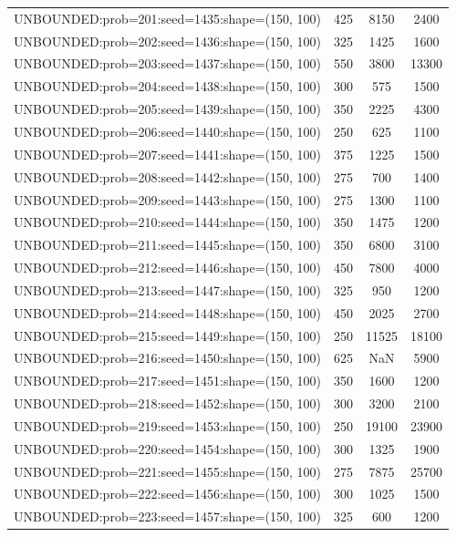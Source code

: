 \begin{longtable}{lccc}
UNBOUNDED:prob=201:seed=1435:shape=(150, 100) &      425 &  8150 &   2400 \\
UNBOUNDED:prob=202:seed=1436:shape=(150, 100) &      325 &  1425 &   1600 \\
UNBOUNDED:prob=203:seed=1437:shape=(150, 100) &      550 &  3800 &  13300 \\
UNBOUNDED:prob=204:seed=1438:shape=(150, 100) &      300 &   575 &   1500 \\
UNBOUNDED:prob=205:seed=1439:shape=(150, 100) &      350 &  2225 &   4300 \\
UNBOUNDED:prob=206:seed=1440:shape=(150, 100) &      250 &   625 &   1100 \\
UNBOUNDED:prob=207:seed=1441:shape=(150, 100) &      375 &  1225 &   1500 \\
UNBOUNDED:prob=208:seed=1442:shape=(150, 100) &      275 &   700 &   1400 \\
UNBOUNDED:prob=209:seed=1443:shape=(150, 100) &      275 &  1300 &   1100 \\
UNBOUNDED:prob=210:seed=1444:shape=(150, 100) &      350 &  1475 &   1200 \\
UNBOUNDED:prob=211:seed=1445:shape=(150, 100) &      350 &  6800 &   3100 \\
UNBOUNDED:prob=212:seed=1446:shape=(150, 100) &      450 &  7800 &   4000 \\
UNBOUNDED:prob=213:seed=1447:shape=(150, 100) &      325 &   950 &   1200 \\
UNBOUNDED:prob=214:seed=1448:shape=(150, 100) &      450 &  2025 &   2700 \\
UNBOUNDED:prob=215:seed=1449:shape=(150, 100) &      250 & 11525 &  18100 \\
UNBOUNDED:prob=216:seed=1450:shape=(150, 100) &      625 &   NaN &   5900 \\
UNBOUNDED:prob=217:seed=1451:shape=(150, 100) &      350 &  1600 &   1200 \\
UNBOUNDED:prob=218:seed=1452:shape=(150, 100) &      300 &  3200 &   2100 \\
UNBOUNDED:prob=219:seed=1453:shape=(150, 100) &      250 & 19100 &  23900 \\
UNBOUNDED:prob=220:seed=1454:shape=(150, 100) &      300 &  1325 &   1900 \\
UNBOUNDED:prob=221:seed=1455:shape=(150, 100) &      275 &  7875 &  25700 \\
UNBOUNDED:prob=222:seed=1456:shape=(150, 100) &      300 &  1025 &   1500 \\
UNBOUNDED:prob=223:seed=1457:shape=(150, 100) &      325 &   600 &   1200 \\

\end{longtable}
